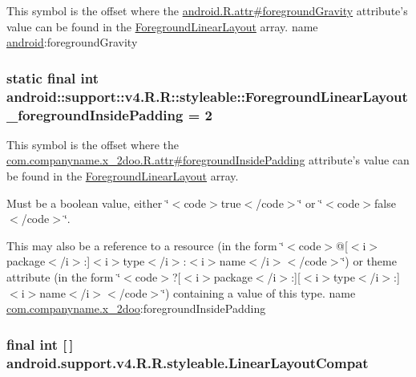 This symbol is the offset where the \hyperlink{}{android.R.attr\#foregroundGravity} attribute's value can be found in the \hyperlink{classandroid_1_1support_1_1v4_1_1_r_1_1styleable_bbe0a7c41b965e1656d09f3bc52b2751}{ForegroundLinearLayout} array.  name \hyperlink{namespaceandroid}{android}:foregroundGravity \hypertarget{classandroid_1_1support_1_1v4_1_1_r_1_1styleable_24c3790a2ccc17ca22f459138b2b1299}{
\subsubsection[{ForegroundLinearLayout\_\-foregroundInsidePadding}]{\setlength{\rightskip}{0pt plus 5cm}static final int android::support::v4.R.R::styleable::ForegroundLinearLayout\_\-foregroundInsidePadding = 2}}
\label{classandroid_1_1support_1_1v4_1_1_r_1_1styleable_24c3790a2ccc17ca22f459138b2b1299}


This symbol is the offset where the \hyperlink{classcom_1_1companyname_1_1x__2doo_1_1_r_1_1attr_08142423a1f435e5b804bbaa450a4925}{com.companyname.x\_\-2doo.R.attr\#foregroundInsidePadding} attribute's value can be found in the \hyperlink{classandroid_1_1support_1_1v4_1_1_r_1_1styleable_bbe0a7c41b965e1656d09f3bc52b2751}{ForegroundLinearLayout} array.

Must be a boolean value, either \char`\"{}$<$code$>$true$<$/code$>$\char`\"{} or \char`\"{}$<$code$>$false$<$/code$>$\char`\"{}. 

This may also be a reference to a resource (in the form \char`\"{}$<$code$>$@\mbox{[}$<$i$>$package$<$/i$>$:\mbox{]}$<$i$>$type$<$/i$>$:$<$i$>$name$<$/i$>$$<$/code$>$\char`\"{}) or theme attribute (in the form \char`\"{}$<$code$>$?\mbox{[}$<$i$>$package$<$/i$>$:\mbox{]}\mbox{[}$<$i$>$type$<$/i$>$:\mbox{]}$<$i$>$name$<$/i$>$$<$/code$>$\char`\"{}) containing a value of this type.  name \hyperlink{namespacecom_1_1companyname_1_1x__2doo}{com.companyname.x\_\-2doo}:foregroundInsidePadding \hypertarget{classandroid_1_1support_1_1v4_1_1_r_1_1styleable_d67ed8d09a6471da7a8c3ba1552dad7e}{
\subsubsection[{LinearLayoutCompat}]{\setlength{\rightskip}{0pt plus 5cm}final int \mbox{[}$\,$\mbox{]} android.support.v4.R.R.styleable.LinearLayoutCompat}}
\label{classandroid_1_1support_1_1v4_1_1_r_1_1styleable_d67ed8d09a6471da7a8c3ba1552dad7e}


